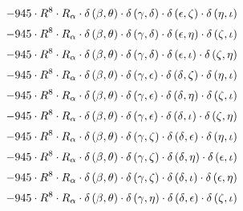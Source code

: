 \begin{subequations}
\begin{gather}
 \\[0.2em] \notag 		 - 945 \cdot R^{8} \cdot R_{\alpha{}} \cdot \delta{}\left(\beta{}, \theta{}\right) \cdot \delta{}\left(\gamma{}, \delta{}\right) \cdot \delta{}\left(\epsilon{}, \zeta{}\right) \cdot \delta{}\left(\eta{}, \iota{}\right) 
 \\[0.2em] \notag 		 - 945 \cdot R^{8} \cdot R_{\alpha{}} \cdot \delta{}\left(\beta{}, \theta{}\right) \cdot \delta{}\left(\gamma{}, \delta{}\right) \cdot \delta{}\left(\epsilon{}, \eta{}\right) \cdot \delta{}\left(\zeta{}, \iota{}\right) 
 \\[0.2em] \notag 		 - 945 \cdot R^{8} \cdot R_{\alpha{}} \cdot \delta{}\left(\beta{}, \theta{}\right) \cdot \delta{}\left(\gamma{}, \delta{}\right) \cdot \delta{}\left(\epsilon{}, \iota{}\right) \cdot \delta{}\left(\zeta{}, \eta{}\right) 
 \\[0.2em] \notag 		 - 945 \cdot R^{8} \cdot R_{\alpha{}} \cdot \delta{}\left(\beta{}, \theta{}\right) \cdot \delta{}\left(\gamma{}, \epsilon{}\right) \cdot \delta{}\left(\delta{}, \zeta{}\right) \cdot \delta{}\left(\eta{}, \iota{}\right) 
 \\[0.2em] \notag 		 - 945 \cdot R^{8} \cdot R_{\alpha{}} \cdot \delta{}\left(\beta{}, \theta{}\right) \cdot \delta{}\left(\gamma{}, \epsilon{}\right) \cdot \delta{}\left(\delta{}, \eta{}\right) \cdot \delta{}\left(\zeta{}, \iota{}\right) 
 \\[0.2em] \notag 		 - 945 \cdot R^{8} \cdot R_{\alpha{}} \cdot \delta{}\left(\beta{}, \theta{}\right) \cdot \delta{}\left(\gamma{}, \epsilon{}\right) \cdot \delta{}\left(\delta{}, \iota{}\right) \cdot \delta{}\left(\zeta{}, \eta{}\right) 
 \\[0.2em] \notag 		 - 945 \cdot R^{8} \cdot R_{\alpha{}} \cdot \delta{}\left(\beta{}, \theta{}\right) \cdot \delta{}\left(\gamma{}, \zeta{}\right) \cdot \delta{}\left(\delta{}, \epsilon{}\right) \cdot \delta{}\left(\eta{}, \iota{}\right) 
 \\[0.2em] \notag 		 - 945 \cdot R^{8} \cdot R_{\alpha{}} \cdot \delta{}\left(\beta{}, \theta{}\right) \cdot \delta{}\left(\gamma{}, \zeta{}\right) \cdot \delta{}\left(\delta{}, \eta{}\right) \cdot \delta{}\left(\epsilon{}, \iota{}\right) 
 \\[0.2em] \notag 		 - 945 \cdot R^{8} \cdot R_{\alpha{}} \cdot \delta{}\left(\beta{}, \theta{}\right) \cdot \delta{}\left(\gamma{}, \zeta{}\right) \cdot \delta{}\left(\delta{}, \iota{}\right) \cdot \delta{}\left(\epsilon{}, \eta{}\right) 
 \\[0.2em] \notag 		 - 945 \cdot R^{8} \cdot R_{\alpha{}} \cdot \delta{}\left(\beta{}, \theta{}\right) \cdot \delta{}\left(\gamma{}, \eta{}\right) \cdot \delta{}\left(\delta{}, \epsilon{}\right) \cdot \delta{}\left(\zeta{}, \iota{}\right) 

\end{gather}
\end{subequations}
